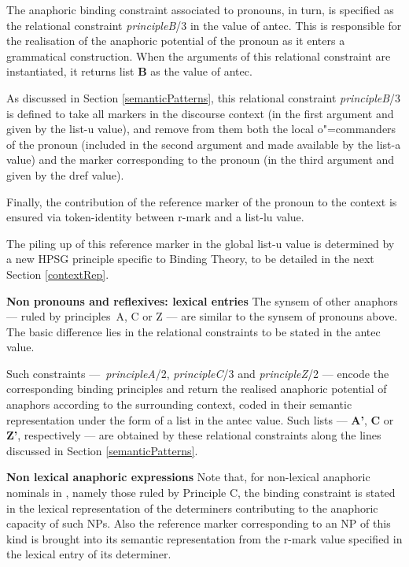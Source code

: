\documentclass[output=paper
,modfonts
,nonflat]{langsci/langscibook}
\begin{document}
The anaphoric binding constraint associated to pronouns, in turn,
is specified as the relational constraint \textit {principleB}/3
in the value of {\sc antec}.  
This is responsible for the realisation of
the anaphoric potential of the pronoun as it enters a grammatical
construction. When the arguments of this relational constraint are instantiated,
it returns list {\bf B} as the value of {\sc antec}. 

As discussed in Section \ref{semanticPatterns}, this relational constraint \textit {principleB}/3 
is defined to take 
all markers in the discourse context (in the first argument and given 
by the {\sc list-u} value), and remove from them both the local \mbox{o"=commanders}  
of the pronoun (included in the second argument and made available by the {\sc list-a}
value)  and the marker corresponding to the pronoun (in the third  argument and
given by the {\sc dref} value).

Finally, the contribution of the reference marker of the pronoun
to the context is ensured via token-identity
between {\sc r-mark} and a {\sc list-lu} value.

The piling up of this reference
marker in the global {\sc list-u} value is determined
by a new HPSG principle specific to Binding Theory, to be detailed in the next Section \ref{contextRep}.

\textbf{Non pronouns and reflexives: lexical entries} The {\sc synsem} of other anaphors --- ruled by principles~A, C or Z --- are 
similar to the {\sc synsem} of pronouns above. The basic difference lies in the
relational constraints to be stated in the {\sc antec} value.

Such constraints  
---~{\it principleA}/2, {\it principleC}/3 and {\it principleZ}/2 --- encode the 
corresponding binding principles and return the realised
anaphoric potential of anaphors according to the surrounding context,
coded in their semantic representation under the form
of a list in the {\sc antec} value. Such 
lists --- {\bf A'}, {\bf C} or {\bf Z'}, respectively --- are obtained 
by these relational constraints along the lines
discussed in Section \ref{semanticPatterns}.

\textbf{Non lexical anaphoric expressions} Note that, for non-lexical anaphoric nominals in , namely those ruled
by Principle C, the binding constraint is stated in the lexical representation
of the determiners contributing to the anaphoric capacity of such NPs.
Also the reference marker corresponding to an NP of this kind is brought into 
its semantic representation from the {\sc r-mark} value
specified in the lexical entry of its determiner.
\end{document}
